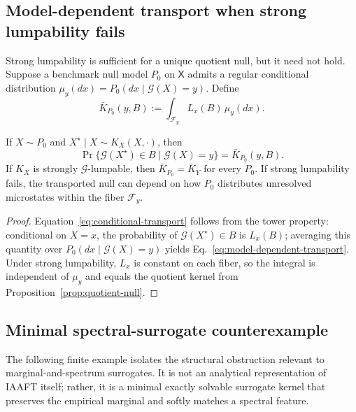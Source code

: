\subsection{Model-dependent transport when strong lumpability fails}

Strong lumpability is sufficient for a unique quotient null, but it need not
hold.  Suppose a benchmark null model $P_0$ on $\mathsf X$ admits a regular
conditional distribution $\mu_y(dx)=P_0(dx\mid \mathcal G(X)=y)$.  Define
\begin{equation}
\bar K_{P_0}(y,B)
:=\int_{\mathcal F_y} L_x(B)\,\mu_y(dx).
\label{eq:model-dependent-transport}
\end{equation}

\begin{proposition}
\label{prop:model-dependent-transport}
If $X\sim P_0$ and $X^\star\mid X\sim K_X(X,\cdot)$, then
\begin{equation}
\Pr\{\mathcal G(X^\star)\in B\mid \mathcal G(X)=y\}
=\bar K_{P_0}(y,B).
\label{eq:conditional-transport}
\end{equation}
If $K_X$ is strongly $\mathcal G$-lumpable, then
$\bar K_{P_0}=\bar K_Y$ for every $P_0$.  If strong lumpability fails, the
transported null can depend on how $P_0$ distributes unresolved microstates
within the fiber $\mathcal F_y$.
\end{proposition}

\begin{proof}
Equation~\eqref{eq:conditional-transport} follows from the tower property:
conditional on $X=x$, the probability of
$\mathcal G(X^\star)\in B$ is $L_x(B)$; averaging this quantity over
$P_0(dx\mid \mathcal G(X)=y)$ yields Eq.~\eqref{eq:model-dependent-transport}.
Under strong lumpability, $L_x$ is constant on each fiber, so the integral is
independent of $\mu_y$ and equals the quotient kernel from
Proposition~\ref{prop:quotient-null}.
\end{proof}

\subsection{Minimal spectral-surrogate counterexample}\label{spectral-counterexample}

The following finite example isolates the structural obstruction relevant to
marginal-and-spectrum surrogates.  It is not an analytical representation of
IAAFT itself; rather, it is a minimal exactly solvable surrogate kernel that
preserves the empirical marginal and softly matches a spectral feature.

